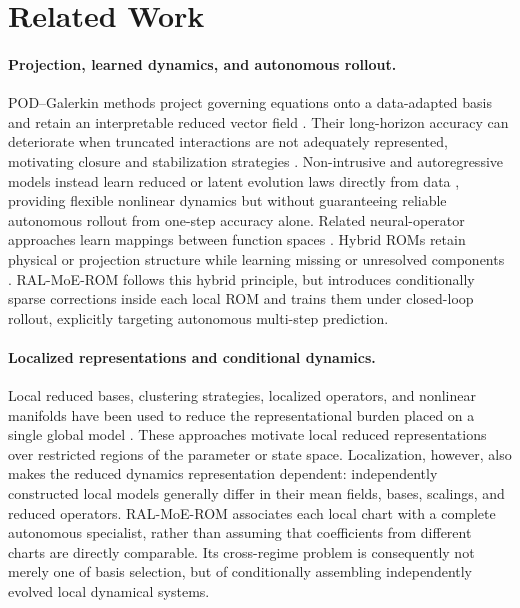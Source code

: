 \section{Related Work}

\paragraph{Projection, learned dynamics, and autonomous rollout.}
POD--Galerkin methods project governing equations onto a data-adapted basis and retain an interpretable reduced vector field \citep{sirovich1987,berkooz1993,benner2015}. Their long-horizon accuracy can deteriorate when truncated interactions are not adequately represented, motivating closure and stabilization strategies \citep{amsallem2012}. Non-intrusive and autoregressive models instead learn reduced or latent evolution laws directly from data \citep{hesthaven2018,lee2020,champion2019,park2024,pathak2018,vlachas2018}, providing flexible nonlinear dynamics but without guaranteeing reliable autonomous rollout from one-step accuracy alone. Related neural-operator approaches learn mappings between function spaces \citep{lu2021,kovachki2023}. Hybrid ROMs retain physical or projection structure while learning missing or unresolved components \citep{duraisamy2019,brunton2020,dar2023,fresca2022,geelen2023}.
RAL-MoE-ROM follows this hybrid principle, but introduces conditionally sparse corrections inside each local ROM and trains them under closed-loop rollout, explicitly targeting autonomous multi-step prediction.


\paragraph{Localized representations and conditional dynamics.}
Local reduced bases, clustering strategies, localized operators, and nonlinear manifolds have been used to reduce the representational burden placed on a single global model \citep{amsallem2008,peherstorfer2014,kaiser2014,li2021cluster,diaz2024}. These approaches motivate local reduced representations over restricted regions of the parameter or state space. Localization, however, also makes the reduced dynamics representation dependent: independently constructed local models generally differ in their mean fields, bases, scalings, and reduced operators. RAL-MoE-ROM associates each local chart with a complete autonomous specialist, rather than assuming that coefficients from different charts are directly comparable. Its cross-regime problem is consequently not merely one of basis selection, but of conditionally assembling independently evolved local dynamical systems.

